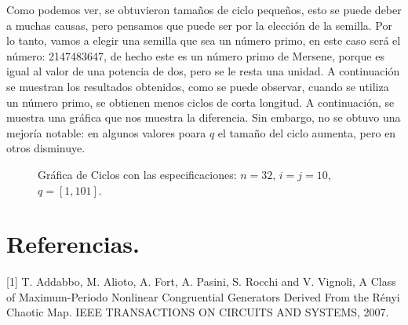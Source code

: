 \documentclass[12pt,3p]{elsarticle}
\begin{document}
Como podemos ver, se obtuvieron tamaños de ciclo pequeños, esto se puede deber a muchas causas, pero pensamos que puede ser por la elección de la semilla. Por lo tanto, vamos a elegir una semilla que sea un número primo, en este caso será el número: 2147483647, de hecho este es un número primo de Mersene, porque es igual al valor de una potencia de dos, pero se le resta una unidad. A continuación se muestran los resultados obtenidos, como se puede observar, cuando se utiliza un número primo, se obtienen menos ciclos de corta longitud. A continuación, se muestra una gráfica que nos muestra la diferencia. Sin embargo, no se obtuvo una mejoría notable: en algunos valores poara $q$ el tamaño del ciclo aumenta, pero en otros disminuye.


\begin{figure}[H]
\centering
{}
\caption{Gráfica de Ciclos con las especificaciones:  $ n=32$, $ i=j=10$, $ q=[1,101]$.} \label{Param4}
\end{figure}







\section{Referencias.}

[1] T. Addabbo, M. Alioto, A. Fort, A. Pasini, S. Rocchi and V. Vignoli, A Class of Maximum-Periodo Nonlinear Congruential Generators Derived From the Rényi Chaotic Map. IEEE TRANSACTIONS ON CIRCUITS AND SYSTEMS, 2007.
\end{document}
